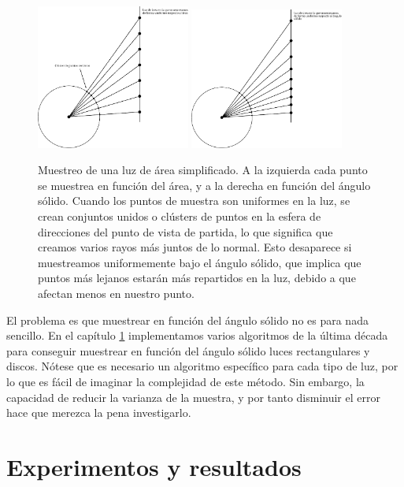 \documentclass{scrbook}
\begin{document}
\begin{figure}[ht]
	\centering
	\includegraphics[width=0.45\textwidth]{area}
	\includegraphics[width=0.45\textwidth]{solid_angle}
	\caption{Muestreo de una luz de área simplificado. A la izquierda cada punto se muestrea en función del área, y a la derecha en función del ángulo sólido. Cuando los puntos de muestra son uniformes en la luz, se crean conjuntos unidos o clústers de puntos en la esfera de direcciones del punto de vista de partida, lo que significa que creamos varios rayos más juntos de lo normal. Esto desaparece si muestreamos uniformemente bajo el ángulo sólido, que implica que puntos más lejanos estarán más repartidos en la luz, debido a que afectan menos en nuestro punto. }
	\label{fig:areasolid}
\end{figure}

El problema es que muestrear en función del ángulo sólido no es para nada sencillo. En el capítulo \ref{Experimentos} implementamos varios algoritmos de la última década para conseguir muestrear en función del ángulo sólido luces rectangulares y discos. Nótese que es necesario un algoritmo específico para cada tipo de luz, por lo que es fácil de imaginar la complejidad de este método. Sin embargo, la capacidad de reducir la varianza de la muestra, y por tanto disminuir el error hace que merezca la pena investigarlo.

\chapter{Experimentos y resultados}
\label{Experimentos}
\end{document}

